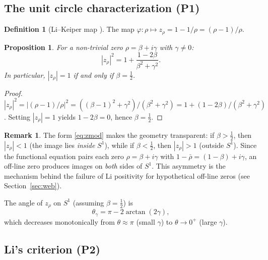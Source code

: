 \documentclass[11pt,a4paper]{article}
\newtheorem{proposition}[theorem]{Proposition}
\theoremstyle{definition}
\newtheorem{definition}[theorem]{Definition}
\newtheorem{remark}[theorem]{Remark}
\begin{document}
\subsection{The unit circle characterization (P1)}

\begin{definition}[Li--Keiper map {\cite{Li1997,Keiper1992}}]\label{def:unit-circle-map}
The map $\varphi\colon \rho \mapsto z_\rho = 1 - 1/\rho = (\rho - 1)/\rho$.
\end{definition}

\begin{proposition}\label{prop:unit-circle}
For a non-trivial zero $\rho = \beta + i\gamma$ with $\gamma \neq 0$:
\begin{equation}\label{eq:zmod}
  |z_\rho|^2 = 1 + \frac{1 - 2\beta}{\beta^2 + \gamma^2}.
\end{equation}
In particular, $|z_\rho| = 1$ if and only if $\beta = \tfrac{1}{2}$.
\end{proposition}

\begin{proof}
$|z_\rho|^2 = |(\rho-1)/\rho|^2 = ((\beta-1)^2 + \gamma^2)/(\beta^2 + \gamma^2) = 1 + (1 - 2\beta)/(\beta^2 + \gamma^2)$.
Setting $|z_\rho| = 1$ yields $1 - 2\beta = 0$, hence $\beta = \tfrac{1}{2}$.
\end{proof}

\begin{remark}\label{rem:z-inside-outside}
The form \eqref{eq:zmod} makes the geometry transparent: if $\beta > \tfrac{1}{2}$, then $|z_\rho| < 1$ (the image lies \emph{inside} $S^1$), while if $\beta < \tfrac{1}{2}$, then $|z_\rho| > 1$ (outside $S^1$). Since the functional equation pairs each zero $\rho = \beta + i\gamma$ with $1 - \bar{\rho} = (1-\beta) + i\gamma$, an off-line zero produces images on \emph{both} sides of $S^1$. This asymmetry is the mechanism behind the failure of Li positivity for hypothetical off-line zeros (see Section~\ref{sec:web}).
\end{remark}

The angle of $z_\rho$ on $S^1$ (assuming $\beta = \tfrac{1}{2}$) is
\begin{equation}\label{eq:theta}
  \theta_\gamma = \pi - 2\arctan(2\gamma),
\end{equation}
which decreases monotonically from $\theta \approx \pi$ (small $\gamma$) to $\theta \to 0^+$ (large $\gamma$).

\subsection{Li's criterion (P2)}
\end{document}

